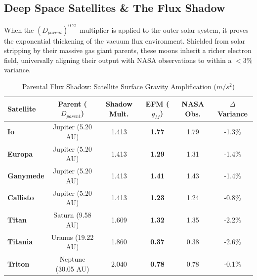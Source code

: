 \documentclass[11pt, a4paper]{article}
\begin{document}
\clearpage
\subsection{Deep Space Satellites \& The Flux Shadow}
When the $(D_{parent})^{0.21}$ multiplier is applied to the outer solar system, it proves the exponential thickening of the vacuum flux environment. Shielded from solar stripping by their massive gas giant parents, these moons inherit a richer electron field, universally aligning their output with NASA observations to within a $<3\%$ variance.

\begin{table}[!ht]
  \centering
  \caption{Parental Flux Shadow: Satellite Surface Gravity Amplification ($m/s^2$)}
  \vspace{0.5em}
  \begin{tabular}{l c c c c c} 
    \toprule
    \textbf{Satellite} & \textbf{Parent ($D_{parent}$)} & \textbf{Shadow Mult.} & \textbf{EFM ($g_M$)} & \textbf{NASA Obs.} & \textbf{$\Delta$ Variance} \\
    \midrule
    \textbf{Io} & Jupiter (5.20 AU) & 1.413 & \textbf{1.77} & 1.79 & -1.3\% \\
    \textbf{Europa} & Jupiter (5.20 AU) & 1.413 & \textbf{1.29} & 1.31 & -1.4\% \\
    \textbf{Ganymede} & Jupiter (5.20 AU) & 1.413 & \textbf{1.41} & 1.43 & -1.4\% \\
    \textbf{Callisto} & Jupiter (5.20 AU) & 1.413 & \textbf{1.23} & 1.24 & -0.8\% \\
    \midrule
    \textbf{Titan} & Saturn (9.58 AU) & 1.609 & \textbf{1.32} & 1.35 & -2.2\% \\
    \midrule
    \textbf{Titania} & Uranus (19.22 AU) & 1.860 & \textbf{0.37} & 0.38 & -2.6\% \\
    \midrule
    \textbf{Triton} & Neptune (30.05 AU) & 2.040 & \textbf{0.78} & 0.78 & -0.1\% \\
    \bottomrule
  \end{tabular}
\end{table}

\end{document}
